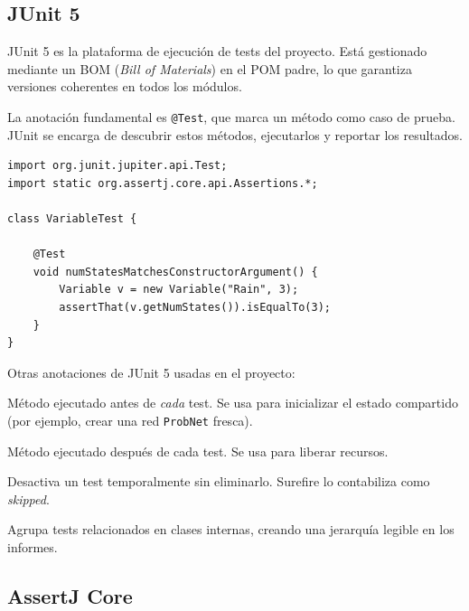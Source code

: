 \documentclass[12pt,a4paper]{article}
\begin{document}
\subsection{JUnit 5}
\label{sec:junit5}

JUnit 5 es la plataforma de ejecución de tests del proyecto. Está gestionado
mediante un BOM (\emph{Bill of Materials}) en el POM padre, lo que garantiza
versiones coherentes en todos los módulos.

La anotación fundamental es \texttt{@Test}, que marca un método como caso de
prueba. JUnit se encarga de descubrir estos métodos, ejecutarlos y reportar
los resultados.

\begin{lstlisting}[caption={Test básico con JUnit 5}, label={lst:junit-test}]
import org.junit.jupiter.api.Test;
import static org.assertj.core.api.Assertions.*;

class VariableTest {

    @Test
    void numStatesMatchesConstructorArgument() {
        Variable v = new Variable("Rain", 3);
        assertThat(v.getNumStates()).isEqualTo(3);
    }
}
\end{lstlisting}

Otras anotaciones de JUnit 5 usadas en el proyecto:

\begin{description}[leftmargin=2em, style=nextline]
  \item[\texttt{@BeforeEach}] Método ejecutado antes de \emph{cada} test.
    Se usa para inicializar el estado compartido (por ejemplo, crear una red
    \texttt{ProbNet} fresca).
  \item[\texttt{@AfterEach}] Método ejecutado después de cada test.
    Se usa para liberar recursos.
  \item[\texttt{@Disabled}] Desactiva un test temporalmente sin eliminarlo.
    Surefire lo contabiliza como \emph{skipped}.
  \item[\texttt{@Nested}] Agrupa tests relacionados en clases internas,
    creando una jerarquía legible en los informes.
\end{description}

\subsection{AssertJ Core}
\label{sec:assertj}
\end{document}
